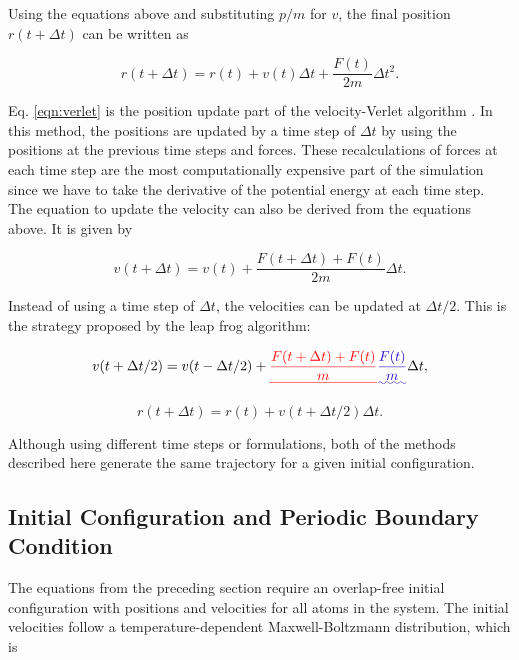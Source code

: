 \documentclass[
	12pt,				%
	openany,			%
	oneside,			%
	a4paper,			%
	english,			%
	brazil				%
	]{abntex2}
\providecommand{\DIFadd}[1]{{\protect\color{blue}\uwave{#1}}}
\providecommand{\DIFdel}[1]{{\protect\color{red}\sout{#1}}}
\providecommand{\DIFaddbegin}{}
\providecommand{\DIFaddend}{}
\providecommand{\DIFdelbegin}{}
\providecommand{\DIFdelend}{}
\providecommand{\DIFadd}[1]{{\protect\color{blue}\uwave{#1}}} %
\providecommand{\DIFdel}[1]{{\protect\color{red}\sout{#1}}}                      %
\providecommand{\DIFaddbegin}{} %
\providecommand{\DIFaddend}{} %
\providecommand{\DIFdelbegin}{} %
\providecommand{\DIFdelend}{} %
\begin{document}
Using the equations above and substituting $p/m$ for $v$, the final position $r(t+\Delta t)$ can be written as

\begin{equation}
r(t+ \Delta t) = r(t) +v(t) \Delta t + \frac{F(t)}{2m} \Delta t^{2}.
\label{eqn:verlet}
\end{equation}

Eq.  \ref{eqn:verlet} is the position update part of the velocity-Verlet algorithm \cite{verlet}. In this method, the positions are updated by a time step of $\Delta t$ by using the positions at the previous time steps and forces. These recalculations of forces at each time step are the most computationally expensive part of the simulation since we have to take the derivative of the potential energy at each time step. The equation to update the velocity can also be derived from the equations above. It is given by

\begin{equation}
v(t+ \Delta t) = v(t) +\frac{F(t+ \Delta t) +F(t)}{2m} \Delta t .
\end{equation}

Instead of using a time step of $\Delta t$, the velocities can be updated at $\Delta t /2$. This is the strategy proposed by the leap frog algorithm:

\begin{equation}
v(t+ \Delta t /2) = v(t- \Delta t /2) +\DIFdelbegin \DIFdel{\frac{F(t+ \Delta t) +F(t)}{m} }\DIFdelend \DIFaddbegin \DIFadd{\frac{F(t)}{m} }\DIFaddend \Delta t ,
\end{equation}

\begin{equation}
r(t+ \Delta t) = r(t) +v(t+ \Delta t /2) \Delta t .
\end{equation}

Although using different time steps or formulations, both of the methods described here generate the same trajectory for a given initial configuration.

\subsection{Initial Configuration and Periodic Boundary Condition} \label{icbc}

The equations from the preceding section require an overlap-free initial configuration with positions and velocities for all atoms in the system. The initial velocities follow a temperature-dependent Maxwell-Boltzmann distribution, which is
\end{document}
